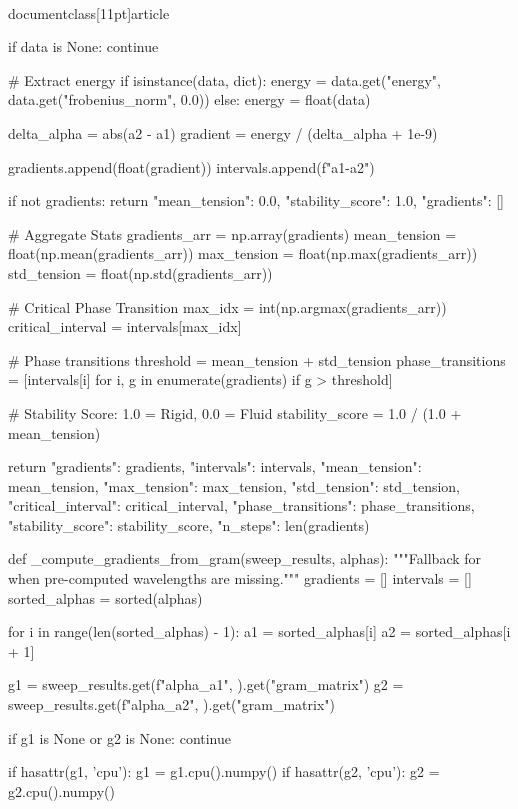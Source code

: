 \\documentclass[11pt]{article}
\begin{document}
\begin{CodeBlock}
        if data is None:
            continue
            
        # Extract energy
        if isinstance(data, dict):
            energy = data.get("energy", data.get("frobenius_norm", 0.0))
        else:
            energy = float(data)
            
        delta_alpha = abs(a2 - a1)
        gradient = energy / (delta_alpha + 1e-9)
        
        gradients.append(float(gradient))
        intervals.append(f"{a1}-{a2}")

    if not gradients:
        return {"mean_tension": 0.0, "stability_score": 1.0, "gradients": []}

    # Aggregate Stats
    gradients_arr = np.array(gradients)
    mean_tension = float(np.mean(gradients_arr))
    max_tension = float(np.max(gradients_arr))
    std_tension = float(np.std(gradients_arr))
    
    # Critical Phase Transition
    max_idx = int(np.argmax(gradients_arr))
    critical_interval = intervals[max_idx]
    
    # Phase transitions
    threshold = mean_tension + std_tension
    phase_transitions = [intervals[i] for i, g in enumerate(gradients) if g > threshold]

    # Stability Score: 1.0 = Rigid, 0.0 = Fluid
    stability_score = 1.0 / (1.0 + mean_tension)

    return {
        "gradients": gradients,
        "intervals": intervals,
        "mean_tension": mean_tension,
        "max_tension": max_tension,
        "std_tension": std_tension,
        "critical_interval": critical_interval,
        "phase_transitions": phase_transitions,
        "stability_score": stability_score,
        "n_steps": len(gradients)
    }

def _compute_gradients_from_gram(sweep_results, alphas):
    """Fallback for when pre-computed wavelengths are missing."""
    gradients = []
    intervals = []
    sorted_alphas = sorted(alphas)

    for i in range(len(sorted_alphas) - 1):
        a1 = sorted_alphas[i]
        a2 = sorted_alphas[i + 1]
        
        g1 = sweep_results.get(f"alpha_{a1}", {}).get("gram_matrix")
        g2 = sweep_results.get(f"alpha_{a2}", {}).get("gram_matrix")

        if g1 is None or g2 is None: continue

        if hasattr(g1, 'cpu'): g1 = g1.cpu().numpy()
        if hasattr(g2, 'cpu'): g2 = g2.cpu().numpy()


\end{CodeBlock}
\end{document}
